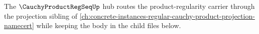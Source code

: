 The $\CauchyProductRegSeqUp$ hub routes the product-regularity carrier through the projection sibling of \autoref{ch:concrete-instances-regular-cauchy-product-projection-namecert} while keeping the body in the child files below.



